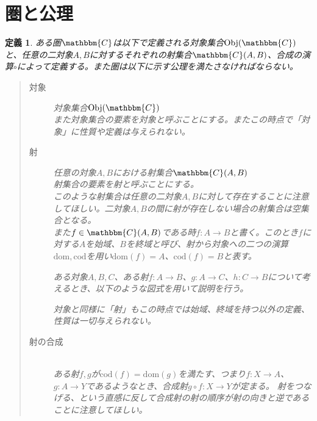 \documentclass[uplatex,dvipdfmx]{jsarticle}
\newcommand{\cat}[1]{\mathbbm{#1}}
\newcommand{\arrow}{\rightarrow}
\newcommand{\obj}[1]{\mathrm{Obj}(\cat{#1})}
\newcommand{\mor}[3]{#1:#2\arrow #3}
\newcommand{\dom}{\mathrm{dom}}
\newcommand{\cod}{\mathrm{cod}}
\newcommand{\arset}[3]{\cat{#1}(#2,#3)}
\newtheorem{define}{定義}[section]
\numberwithin{proof}{subsection}
\numberwithin{prop}{subsection}
\numberwithin{define}{subsection}
\begin{document}
	\section{圏と公理}
	\begin{define}
    ある圏$\cat{C}$は以下で定義される対象集合$\obj{C}$と、任意の二対象$A,B$に対するそれぞれの射集合$\arset{C}{A}{B}$、合成の演算$\circ$によって定義する。また圏は以下に示す公理を満たさなければならない。
		\begin{quote}
			\begin{description}
			\item[対象] 対象集合$\obj{C}$\\
      また対象集合の要素を対象と呼ぶことにする。またこの時点で「対象」に性質や定義は与えられない。
			\item[射] 任意の対象$A,B$における射集合$\arset{C}{A}{B}$\\
      射集合の要素を射と呼ぶことにする。\\
			このような射集合は任意の二対象$A,B$に対して存在することに注意してほしい。二対象$A,B$の間に射が存在しない場合の射集合は空集合となる。
			\\また$f\in\arset{C}{A}{B}$である時$\mor{f}{A}{B}$と書く。このとき$f$に対する$A$を始域、$B$を終域と呼び、射から対象への二つの演算$\dom,\cod$を用い$\dom(f)=A$、$\cod(f)=B$と表す。

			ある対象$A,B,C$、ある射$\mor{f}{A}{B}$、$\mor{g}{A}{C}$、$\mor{h}{C}{B}$について考えるとき、以下のような図式を用いて説明を行う。
			\begin{center}
			\end{center}
      対象と同様に「射」もこの時点では始域、終域を持つ以外の定義、性質は一切与えられない。
			\item[射の合成]~\\ ある射$f,g$が$\cod(f)=\dom(g)$を満たす、つまり$\mor{f}{X}{A}$、$\mor{g}{A}{Y}$であるようなとき、合成射$\mor{g\circ f}{X}{Y}$が定まる。
			射をつなげる、という直感に反して合成射の射の順序が射の向きと逆であることに注意してほしい。


\end{description}
\end{quote}
\end{define}
\end{document}
